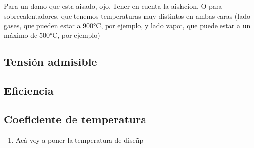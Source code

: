 Para un domo que esta aisado, ojo. Tener en cuenta la aislacion. O para sobrecalentadores, que tenemos temperaturas muy distintas en ambas caras (lado gases, que pueden estar a 900°C, por ejemplo, y lado vapor, que puede estar a un máximo de 500°C, por ejemplo)


\subsection{Tensión admisible}

\subsection{Eficiencia}

\subsection{Coeficiente de temperatura}

\begin{enumerate}
     \item Acá voy a poner la temperatura de diseñp
\end{enumerate}



















